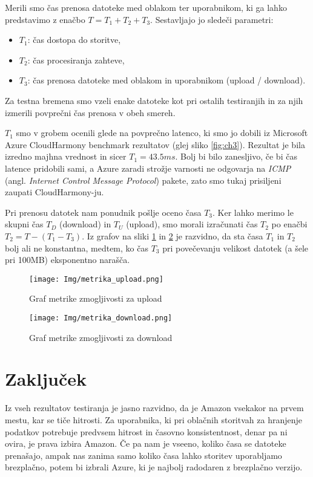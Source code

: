\documentclass[11pt]{article}
\begin{document}
Merili smo čas prenosa datoteke med oblakom ter uporabnikom, ki ga lahko predstavimo z enačbo \(T = T_{1} + T_{2} + T_{3}\). Sestavljajo jo sledeči parametri:
\begin{itemize}
    \item \(T_{1}\): čas dostopa do storitve,
    \item \(T_{2}\): čas procesiranja zahteve,
    \item \(T_{3}\): čas prenosa datoteke med oblakom in uporabnikom (upload / download).
\end{itemize}
Za testna bremena smo vzeli enake datoteke kot pri ostalih testiranjih in za njih izmerili povprečni čas prenosa v obeh smereh.

\(T_{1}\) smo v grobem ocenili glede na povprečno latenco, ki smo jo dobili iz Microsoft Azure CloudHarmony benchmark rezultatov (glej sliko \ref{fig:ch3}). Rezultat je bila izredno majhna vrednost in sicer \(T_{1} = 43.5ms\). Bolj bi bilo zanesljivo, če bi čas latence pridobili sami, a Azure zaradi strožje varnosti ne odgovarja na \textit{ICMP} (angl. \textit{Internet Control Message Protocol}) pakete, zato smo tukaj prisiljeni zaupati CloudHarmony-ju.

Pri prenosu datotek nam ponudnik pošlje oceno časa \(T_{3}\). Ker lahko merimo le skupni čas \(T_{D}\) (download) in \(T_{U}\) (upload), smo  morali izračunati čas \(T_{2}\) po enačbi \(T_{2} = T - (T_{1} - T_{3}) \). Iz grafov na sliki \ref{fig:graph13} in \ref{fig:graph14} je razvidno, da sta časa \(T_{1}\) in \(T_{2}\) bolj ali ne konstantna, medtem, ko čas \(T_{3}\) pri povečevanju velikost datotek (a šele pri 100MB) eksponentno narašča. 

\begin{figure}[H] 
    \begin{center}
        \texttt{[image: Img/metrika\_upload.png]}
        \caption{Graf metrike zmogljivosti za upload}
        \label{fig:graph13}
    \end{center}
\end{figure}

\begin{figure}[H]
    \begin{center}
        \texttt{[image: Img/metrika\_download.png]}
        \caption{Graf metrike zmogljivosti za download}
        \label{fig:graph14}
    \end{center}
\end{figure}

\section{Zaključek}
Iz vseh rezultatov testiranja je jasno razvidno, da je Amazon vsekakor na prvem mestu, kar se tiče hitrosti. Za uporabnika, ki pri oblačnih storitvah za hranjenje podatkov potrebuje predvsem hitrost in časovno konsistentnost, denar pa ni ovira, je prava izbira Amazon. Če pa nam je vseeno, koliko časa se datoteke prenašajo, ampak nas zanima samo koliko časa lahko storitev uporabljamo brezplačno, potem bi izbrali Azure, ki je najbolj radodaren z brezplačno verzijo. 
\end{document}
